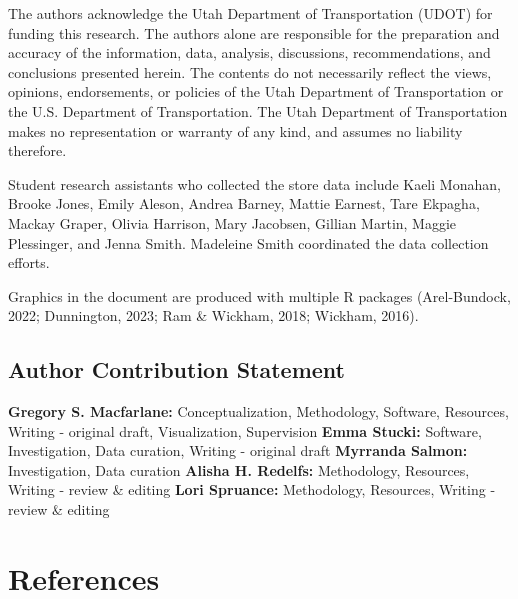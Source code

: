 \documentclass[
  letterpaper,
  number,
  review,
  3p]{elsarticle}
\begin{document}

The authors acknowledge the Utah Department of Transportation (UDOT) for
funding this research. The authors alone are responsible for the
preparation and accuracy of the information, data, analysis,
discussions, recommendations, and conclusions presented herein. The
contents do not necessarily reflect the views, opinions, endorsements,
or policies of the Utah Department of Transportation or the U.S.
Department of Transportation. The Utah Department of Transportation
makes no representation or warranty of any kind, and assumes no
liability therefore.

Student research assistants who collected the store data include Kaeli
Monahan, Brooke Jones, Emily Aleson, Andrea Barney, Mattie Earnest, Tare
Ekpagha, Mackay Graper, Olivia Harrison, Mary Jacobsen, Gillian Martin,
Maggie Plessinger, and Jenna Smith. Madeleine Smith coordinated the data
collection efforts.

Graphics in the document are produced with multiple R packages
(Arel-Bundock, 2022; Dunnington, 2023; Ram \& Wickham, 2018; Wickham,
2016).

\subsection*{Author Contribution
Statement}\label{author-contribution-statement}


\textbf{Gregory S. Macfarlane:} Conceptualization, Methodology,
Software, Resources, Writing - original draft, Visualization,
Supervision \textbf{Emma Stucki:} Software, Investigation, Data
curation, Writing - original draft \textbf{Myrranda Salmon:}
Investigation, Data curation \textbf{Alisha H. Redelfs:} Methodology,
Resources, Writing - review \& editing \textbf{Lori Spruance:}
Methodology, Resources, Writing - review \& editing


\section*{References}\label{references}

\end{document}

